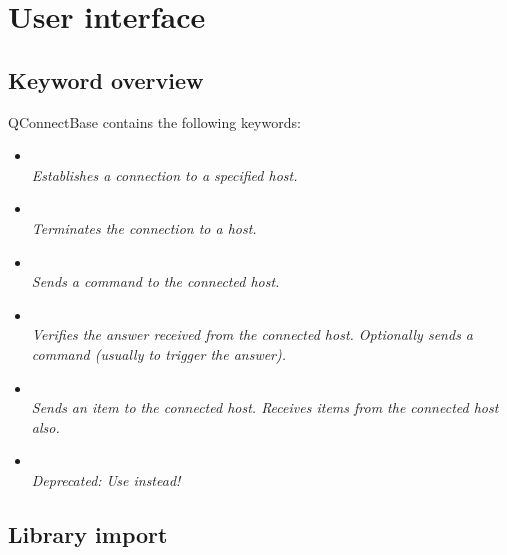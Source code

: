 



\section{User interface}

\subsection{Keyword overview}

QConnectBase contains the following keywords:

\begin{itemize}
   \item {}\\
         \textit{Establishes a connection to a specified host.}
   \item {}\\
         \textit{Terminates the connection to a host.}
   \item {}\\
         \textit{Sends a command to the connected host.}
   \item {}\\
         \textit{Verifies the answer received from the connected host. Optionally sends a command (usually to trigger the answer).}
   \item {}\\
         \textit{Sends an item to the connected host. Receives items from the connected host also.}
   \item {}\\
         \textit{Deprecated: Use  instead!}
\end{itemize}

\subsection{Library import}

